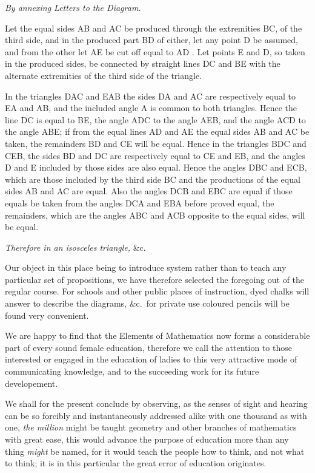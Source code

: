 \qedNB

\begin{center}
\emph{By annexing Letters to the Diagram.}
\end{center}

Let the equal sides AB and AC be produced through the extremities BC, of the third side, and in the produced part BD of either, let any point D be assumed, and from the other let AE be cut off equal to AD . Let points E and D, so taken in the produced sides, be connected by straight lines DC and BE with the alternate extremities of the third side of the triangle.

In the triangles DAC and EAB the sides DA and AC are respectively equal to EA and AB, and the included angle A is common to both triangles. Hence  the line DC is equal to BE, the angle ADC to the angle AEB, and the angle ACD to the angle ABE; if from the equal lines AD and AE the equal sides AB and AC be taken, the remainders BD and CE will be equal. Hence in the triangles BDC and CEB, the sides BD and DC are respectively equal to CE and EB, and the angles D and E included by those sides are also equal. Hence  the angles DBC and ECB, which are those included by the third side BC and the productions of the equal sides AB and AC are equal. Also the angles DCB and EBC are equal if those equals be taken from the angles DCA and EBA before proved equal, the remainders, which are the angles ABC and ACB opposite to the equal sides, will be equal.

\emph{Therefore in an isosceles triangle,} \&c.

\qedNB

Our object in this place being to introduce system rather than to teach any particular set of propositions, we have therefore selected the foregoing out of the regular course. For schools and other public places of instruction, dyed chalks will answer to describe the diagrams, \&c.\ for private use coloured pencils will be found very convenient.

We are happy to find that the Elements of Mathematics now forms a considerable part of every sound female education, therefore we call the attention to those interested or engaged in the education of ladies to this very attractive mode of communicating knowledge, and to the succeeding work for its future developement.

We shall for the present conclude by observing, as the senses of sight and hearing can be so forcibly and instantaneously addressed alike with one thousand as with one, \emph{the million} might be taught geometry and other branches of mathematics with great ease, this would advance the purpose of education more than any thing \emph{might} be named, for it would teach the people how to think, and not what to think; it is in this particular the great error of education originates.


